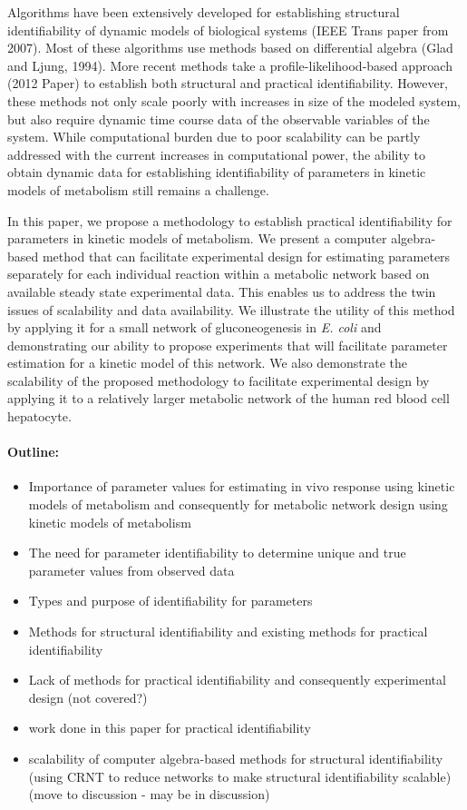\documentclass[10pt]{article}
\begin{document}
Algorithms have been extensively developed for establishing structural identifiability of dynamic models of biological systems (IEEE Trans paper from 2007). Most of these algorithms use methods based on differential algebra (Glad and Ljung, 1994). More recent methods take a profile-likelihood-based approach (2012 Paper) to establish both structural and practical identifiability. However, these methods not only scale poorly with increases in size of the modeled system, but also require dynamic time course data of the observable variables of the system. While computational burden due to poor scalability can be partly addressed with the current increases in computational power, the ability to obtain dynamic data for establishing identifiability of parameters in kinetic models of metabolism still remains a challenge. 

In this paper, we propose a methodology to establish practical identifiability for parameters in kinetic models of metabolism. We present a computer algebra-based method that can facilitate experimental design for estimating parameters separately for each individual reaction within a metabolic network based on available steady state experimental data. This enables us to address the twin issues of scalability and data availability. We illustrate the utility of this method by applying it for a small network of gluconeogenesis in \textit{E. coli} and demonstrating our ability to propose experiments that will facilitate parameter estimation for a kinetic model of this network. We also demonstrate the scalability of the proposed methodology to facilitate experimental design by applying it to a relatively larger metabolic network of the human red blood cell hepatocyte. 
	
\paragraph{Outline:}
\begin{itemize}
	\item Importance of parameter values for estimating in vivo response using kinetic models of metabolism and consequently for metabolic network design using kinetic models of metabolism
	\item The need for parameter identifiability to determine unique and true parameter values from observed data
	\item Types and purpose of identifiability for parameters
	\item Methods for structural identifiability and existing methods for practical identifiability
	\item Lack of methods for practical identifiability and consequently experimental design (not covered?)
	\item work done in this paper for practical identifiability			
	\item scalability of computer algebra-based methods for structural identifiability (using CRNT to reduce networks to make structural identifiability scalable) (move to discussion - may be in discussion)
\end{itemize}
	
\end{document}
